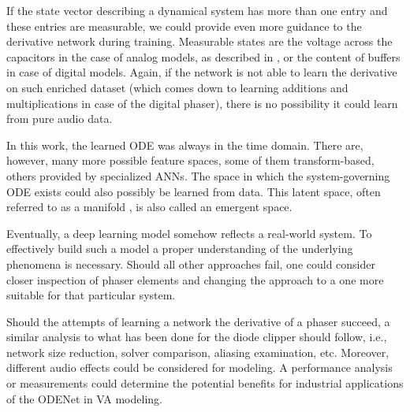 If the state vector describing a dynamical system has more than one entry and these entries are measurable, we could provide even more guidance to the derivative network during training. Measurable states are the voltage across the capacitors in the case of analog models, as described in \cite{Parker2019}, or the content of buffers in case of digital models. Again, if the network is not able to learn the derivative on such enriched dataset (which comes down to learning additions and multiplications in case of the digital phaser), there is no possibility it could learn from pure audio data.

In this work, the learned \ac{ODE} was always in the time domain. There are, however, many more possible feature spaces, some of them transform-based, others provided by specialized \acp{ANN}. %
The space in which the system-governing \ac{ODE} exists could also possibly be learned from data. This latent space, often referred to as a manifold \cite{Goodfellow-et-al-2016}, is also called an emergent space. %

Eventually, a deep learning model somehow reflects a real-world system. To effectively build such a model a proper understanding of the underlying phenomena is necessary. Should all other approaches fail, one could consider closer inspection of phaser elements and changing the approach to a one more suitable for that particular system.

Should the attempts of learning a network the derivative of a phaser succeed, a similar analysis to what has been done for the diode clipper should follow, i.e., network size reduction, solver comparison, aliasing examination, etc. Moreover, different audio effects could be considered for modeling. A performance analysis or measurements could determine the potential benefits for industrial applications of the ODENet in \ac{VA} modeling.
